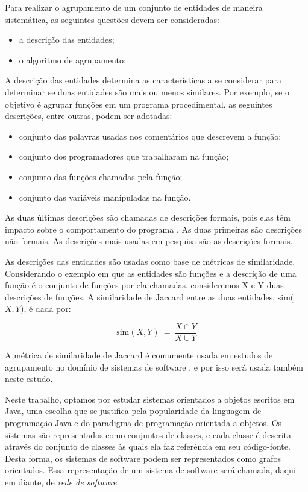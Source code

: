 \begin{itemize}


Para realizar o agrupamento de um conjunto de entidades de maneira sistemática, as seguintes questões devem ser consideradas:

\begin{itemize}
	\item a descrição das entidades;
	\item o algoritmo de agrupamento;
\end{itemize}

A descrição das entidades determina as características a se considerar para determinar se duas entidades são mais ou menos similares. Por exemplo, se o objetivo é agrupar funções em um programa procedimental, as seguintes descrições, entre outras, podem ser adotadas:

\begin{itemize}
	\item conjunto das palavras usadas nos comentários que descrevem a função;
	\item conjunto dos programadores que trabalharam na função;
	\item conjunto das funções chamadas pela função;
	\item conjunto das variáveis manipuladas na função.
\end{itemize}

As duas últimas descrições são chamadas de descrições formais, pois elas têm impacto sobre o comportamento do programa \cite{Anquetil1999}. As duas primeiras são descrições não-formais. As descrições mais usadas em pesquisa são as descrições formais.

As descrições das entidades são usadas como base de métricas de similaridade. Considerando o exemplo em que as entidades são funções e a descrição de uma função é o conjunto de funções por ela chamadas, consideremos X e Y duas descrições de funções. A similaridade de Jaccard entre as duas entidades, sim($X, Y$), é dada por:

$$
\mathrm{sim}(X, Y) ~=~ \frac{X \cap Y}{X \cup Y}
$$

A métrica de similaridade de Jaccard é comumente usada em estudos de agrupamento no domínio de sistemas de software \cite{Anquetil1999,Wu2005}, e por isso será usada também neste estudo.

Neste trabalho, optamos por estudar sistemas orientados a objetos escritos em Java, uma escolha que se justifica pela popularidade da linguagem de programação Java e do paradigma de programação orientada a objetos. Os sistemas são representados como conjuntos de classes, e cada classe é descrita através do conjunto de classes às quais ela faz referência em seu código-fonte. Desta forma, os sistemas de software podem ser representados como grafos orientados. Essa representação de um sistema de software será chamada, daqui em diante, de \emph{rede de software}.


\end{itemize}
